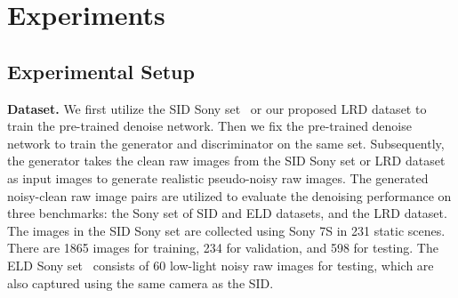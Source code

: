 \documentclass[10pt,twocolumn,letterpaper]{article}
\begin{document}
\begin{table}[!t]
\centering
\caption{Average Kullback-Leibler divergence (AKLD)~\cite{yue2020dual} evaluation of different noise models. Our proposed noise model outperforms state-of-the-art methods on both SID and LRD datasets.}
\vspace{2pt}
\label{table:KLD}
\vspace{-3ex}
\end{table}

\vspace{-0.5em}
\section{Experiments}
\label{experiment}
\vspace{-0.5em}
\subsection{Experimental Setup}
\vspace{-0.5em}
\textbf{Dataset.} We first utilize the SID Sony set~\cite{chen2018learning} or our proposed LRD dataset to train the pre-trained denoise network. Then we fix the pre-trained denoise network to train the generator and discriminator on the same set. Subsequently, the generator takes the clean raw images from the SID Sony set or LRD dataset as input images to generate realistic pseudo-noisy raw images. The generated noisy-clean raw image pairs are utilized to evaluate the denoising performance on three benchmarks: the Sony set of SID and ELD datasets, and the LRD dataset. The images in the SID Sony set are collected using Sony 7S\uppercase\expandafter{} in 231 static scenes. There are 1865 images for training, 234 for validation, and 598 for testing. The ELD Sony set~\cite{wei2020physics} consists of 60 low-light noisy raw images for testing, which are also captured using the same camera as the SID.
\end{document}
